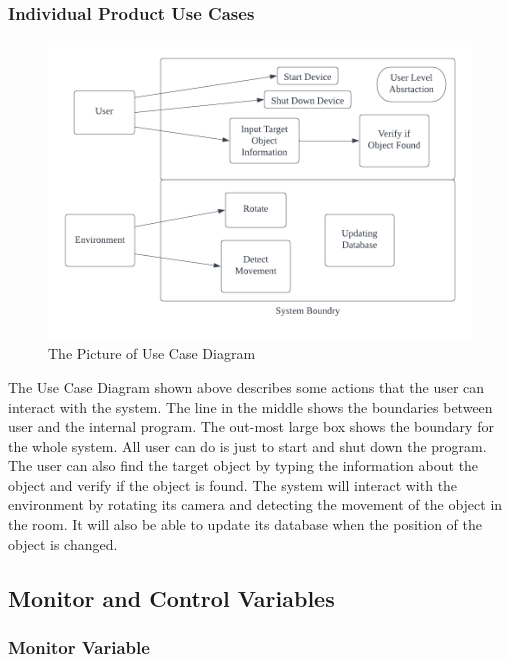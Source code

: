 \documentclass[12pt]{article}
\begin{document}
\subsubsection{Individual Product Use Cases}
\begin{figure}[H]
    \centering
    \includegraphics[scale=0.8]{Use.png}
    \caption{The Picture of Use Case Diagram}
\end{figure}
The Use Case Diagram shown above describes some actions that the user can interact with the system. The line in the middle shows the boundaries between user and the internal program. The out-most large box shows the boundary for the whole system. All user can do is just to start and shut down the program. The user can also find the target object by typing the information about the object and verify if the object is found. The system will interact with the environment by rotating its camera and detecting the movement of the object in the room. It will also be able to update its database when the position of the object is changed. 

\subsection{Monitor and Control Variables}
\subsubsection{Monitor Variable}
\end{document}
